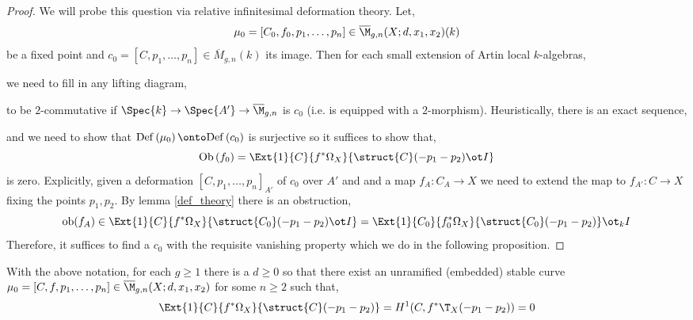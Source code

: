 \documentclass[12pt]{article}
\begin{document}
\begin{proof}
We will probe this question via relative infinitesimal deformation theory. Let,
\[ \mu_0 = [C_0, f_0, p_1, \dots, p_n] \in \overline{\M}_{g,n}(X; d, x_1, x_2)(k) \]
be a fixed point and $c_0 = [C, p_1, \dots, p_n] \in \overline{M}_{g,n}(k)$ its image. Then for each small extension of Artin local $k$-algebras,
\begin{center}
\end{center}
we need to fill in any lifting diagram,
\begin{center}
\end{center}
to be $2$-commutative if $\Spec{k} \to \Spec{A'} \to \overline{\M}_{g,n}$ is $c_0$ (i.e. is equipped with a $2$-morphism). Heuristically, there is an exact sequence,
\begin{center}
\end{center}
and we need to show that $\Def{\mu_0} \onto \Def{c_0}$ is surjective so it suffices to show that,
\[ \Ob{f_0} = \Ext{1}{C}{f^* \Omega_{X}}{\struct{C}(-p_1-p_2) \ot I} \]
is zero. 
Explicitly, given a deformation $[C, p_1, \dots, p_n]_{A'}$ of $c_0$ over $A'$ and and a map $f_A : C_A \to X$ we need to extend the map to $f_{A'} : C \to X$ fixing the points $p_1, p_2$. By lemma \ref{def_theory} there is an obstruction,
\[ \ob (f_A) \in \Ext{1}{C}{f^* \Omega_X}{\struct{C_0}(-p_1 - p_2) \ot I} = \Ext{1}{C_0}{f_0^* \Omega_X}{\struct{C_0}(-p_1-p_2)} \ot_k I \]
Therefore, it suffices to find a $c_0$ with the requisite vanishing property which we do in the following proposition. 
\end{proof}

\begin{prop}
With the above notation, for each $g \ge 1$ there is a $d \ge 0$ so that there exist an unramified (embedded) stable curve $\mu_0 = [C, f, p_1, \dots, p_n] \in \overline{\M}_{g,n}(X ; d, x_1, x_2)$ for some $n \ge 2$ such that,
\[ \Ext{1}{C}{f^* \Omega_X}{\struct{C}(-p_1 - p_2)} = H^1(C, f^* \T_X(-p_1-p_2)) = 0 \]
\end{prop}
\end{document}
